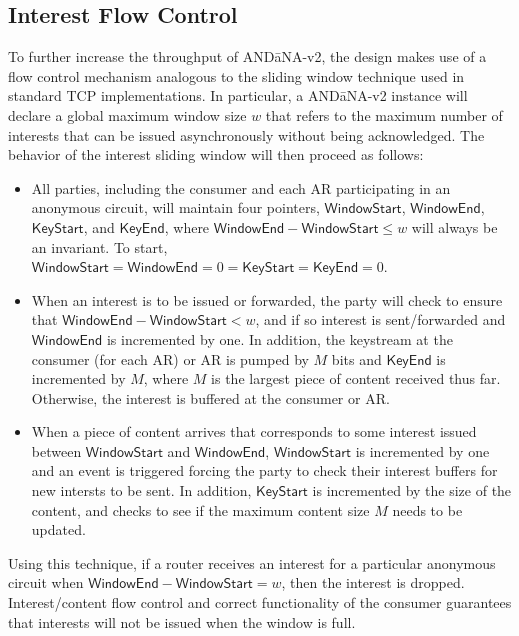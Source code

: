 \documentclass[10pt]{article}
\begin{document}
\subsection{Interest Flow Control}
To further increase the throughput of {\sf AND\=aNA-v2}, the design makes use of a flow control mechanism analogous to the sliding window technique used in standard TCP implementations. In particular, a {\sf AND\=aNA-v2} instance will declare a global maximum window size $w$ that refers to the maximum number of interests that can be issued asynchronously without being acknowledged. The behavior of the interest sliding window will then proceed as follows:
\begin{itemize}
  \item All parties, including the consumer and each AR participating in an anonymous circuit, will maintain four pointers, $\mathsf{WindowStart}$, $\mathsf{WindowEnd}$, $\mathsf{KeyStart}$, and $\mathsf{KeyEnd}$, where $\mathsf{WindowEnd} - \mathsf{WindowStart} \leq w$ will always be an invariant. To start, $\mathsf{WindowStart} = \mathsf{WindowEnd} = 0 = \mathsf{KeyStart} = \mathsf{KeyEnd} = 0$.
  \item When an interest is to be issued or forwarded, the party will check to ensure that $\mathsf{WindowEnd} - \mathsf{WindowStart} < w$, and if so interest is sent/forwarded and $\mathsf{WindowEnd}$ is incremented by one. In addition, the keystream at the consumer (for each AR) or AR is pumped by $M$ bits and $\mathsf{KeyEnd}$ is incremented by $M$, where $M$ is the largest piece of content received thus far. Otherwise, the interest is buffered at the consumer or AR. 
  \item When a piece of content arrives that corresponds to some interest issued between $\mathsf{WindowStart}$ and $\mathsf{WindowEnd}$, $\mathsf{WindowStart}$ is incremented by one and an event is triggered forcing the party to check their interest buffers for new intersts to be sent. In addition, $\mathsf{KeyStart}$ is incremented by the size of the content, and checks to see if the maximum content size $M$ needs to be updated.
\end{itemize}
Using this technique, if a router receives an interest for a particular anonymous circuit when $\mathsf{WindowEnd} - \mathsf{WindowStart} = w$, then the interest is dropped. Interest/content flow control and correct functionality of the consumer guarantees that interests will not be issued when the window is full. 
\end{document}
